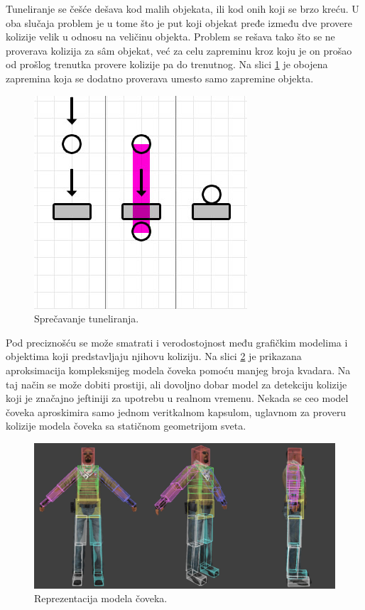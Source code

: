 \documentclass[12pt,oneside]{memoir}
\begin{document}
Tuneliranje se češće dešava kod malih objekata, ili kod onih koji se brzo kreću.
U oba slučaja problem je u tome što je put koji objekat pređe između dve provere kolizije velik u odnosu na veličinu objekta. 
Problem se rešava tako što se ne proverava kolizija za sâm objekat, već za celu zapreminu kroz koju je on prošao 
od prošlog trenutka provere kolizije pa do trenutnog. Na slici \ref{fig:tunnel_fix} je obojena zapremina 
koja se dodatno proverava umesto samo zapremine objekta. 

\begin{figure}[h!]
	\begin{center}
	\includegraphics[scale=0.55]{tunnel_fixed.png}
	\end{center}
	\caption{Sprečavanje tuneliranja.}
	\label{fig:tunnel_fix}
\end{figure}

Pod preciznošću se može smatrati i verodostojnost među grafičkim modelima i objektima koji predstavljaju njihovu koliziju.
Na slici \ref{fig:hitbox} je prikazana aproksimacija kompleksnijeg modela čoveka pomoću manjeg broja kvadara.
Na taj način se može dobiti prostiji, ali dovoljno dobar model za detekciju kolizije koji je značajno 
jeftiniji za upotrebu u realnom vremenu. 
Nekada se ceo model čoveka aproskimira samo jednom veritkalnom kapsulom, 
uglavnom za proveru kolizije modela čoveka sa statičnom geometrijom sveta. 

\begin{figure}[h!]
	\begin{center}
	\includegraphics[scale=0.55]{hitbox.png}
	\end{center}
	\caption{Reprezentacija modela čoveka.}
	\label{fig:hitbox}
\end{figure}
\end{document}
